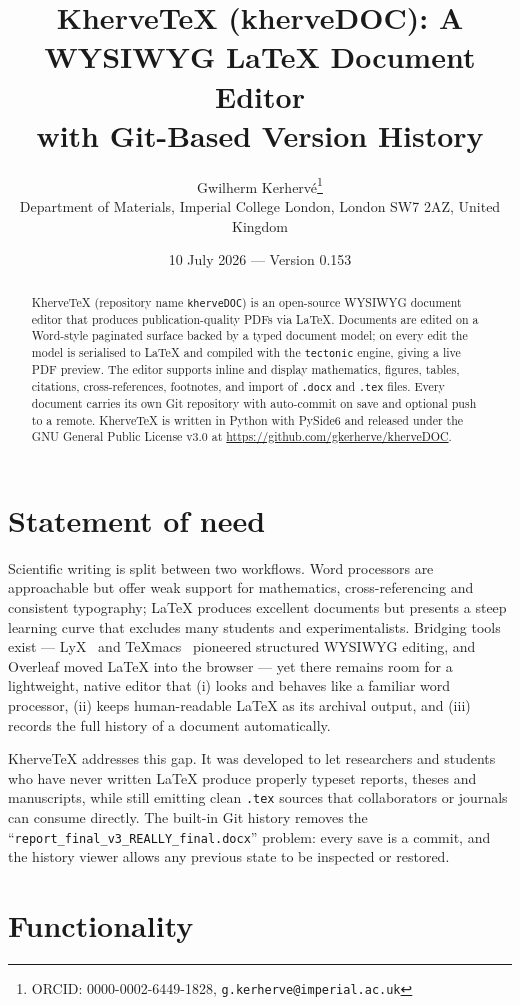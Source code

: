 \documentclass[11pt,a4paper]{article}
\title{KherveTeX (kherveDOC): A WYSIWYG LaTeX Document Editor\\with Git-Based Version History}
\author{Gwilherm Kerhervé\thanks{ORCID: 0000-0002-6449-1828, \texttt{g.kerherve@imperial.ac.uk}}\\
\small Department of Materials, Imperial College London, London SW7 2AZ, United Kingdom}
\date{10 July 2026 --- Version 0.153}
\begin{document}
\maketitle

\begin{abstract}
KherveTeX (repository name \texttt{kherveDOC}) is an open-source WYSIWYG document editor that produces publication-quality PDFs via LaTeX. Documents are edited on a Word-style paginated surface backed by a typed document model; on every edit the model is serialised to LaTeX and compiled with the \texttt{tectonic} engine, giving a live PDF preview. The editor supports inline and display mathematics, figures, tables, citations, cross-references, footnotes, and import of \texttt{.docx} and \texttt{.tex} files. Every document carries its own Git repository with auto-commit on save and optional push to a remote. KherveTeX is written in Python with PySide6 and released under the GNU General Public License v3.0 at \url{https://github.com/gkerherve/kherveDOC}.
\end{abstract}

\section{Statement of need}

Scientific writing is split between two workflows. Word processors are approachable but offer weak support for mathematics, cross-referencing and consistent typography; LaTeX produces excellent documents but presents a steep learning curve that excludes many students and experimentalists. Bridging tools exist --- LyX~\cite{lyx} and TeXmacs~\cite{texmacs} pioneered structured WYSIWYG editing, and Overleaf moved LaTeX into the browser --- yet there remains room for a lightweight, native editor that (i) looks and behaves like a familiar word processor, (ii) keeps human-readable LaTeX as its archival output, and (iii) records the full history of a document automatically.

KherveTeX addresses this gap. It was developed to let researchers and students who have never written LaTeX produce properly typeset reports, theses and manuscripts, while still emitting clean \texttt{.tex} sources that collaborators or journals can consume directly. The built-in Git history removes the ``\texttt{report\_final\_v3\_REALLY\_final.docx}'' problem: every save is a commit, and the history viewer allows any previous state to be inspected or restored.

\section{Functionality}
\end{document}
